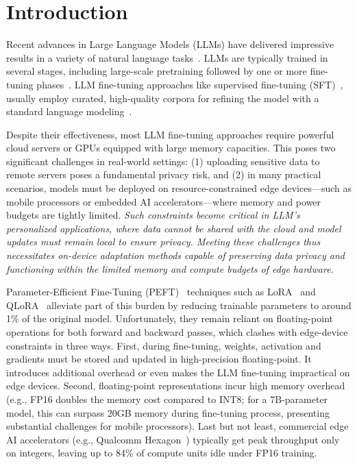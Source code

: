 \section{Introduction}
Recent advances in Large Language Models (LLMs) have delivered impressive results in a variety of natural language tasks~\citep{touvron2023llama,touvron2023llama2,liu2023gpt}.
LLMs are typically trained in several stages, including large-scale pretraining followed by one or more fine-tuning phases~\cite{dubey2024llama,liu2024deepseek}. 
LLM fine-tuning approaches like supervised fine-tuning (SFT)~\citep{zhang2023instruction}, usually employ curated, high-quality corpora for refining the model with a standard language modeling~\cite{chiang2023vicuna}.

Despite their effectiveness, most LLM fine-tuning approaches require powerful cloud servers or GPUs equipped with large memory capacities. 
This poses two significant challenges in real-world settings: (1) uploading sensitive data to remote servers poses a fundamental privacy risk, and (2) in many practical scenarios, models must be deployed on resource-constrained edge devices—such as mobile processors or embedded AI accelerators—where memory and power budgets are tightly limited.  
\textit{Such constraints become critical in LLM's personalized applications, where data cannot be shared with the cloud and model updates must remain local to ensure privacy. Meeting these challenges thus necessitates on-device adaptation methods capable of preserving data privacy and functioning within the limited memory and compute budgets of edge hardware.}

Parameter-Efficient Fine-Tuning (PEFT)~\cite{han2024parameter} techniques such as LoRA~\cite{hu2021lora} and QLoRA~\cite{dettmers2023qlora} alleviate part of this burden by reducing trainable parameters to around 1\% of the original model. Unfortunately, they remain reliant on floating-point operations for both forward and backward passes, which clashes with edge-device constraints in three ways. 
First, during fine-tuning, weights, activation and gradients must be stored and updated in high-precision floating-point. It introduces additional overhead or even makes the LLM fine-tuning impractical on edge devices. Second, floating-point representations incur high memory overhead (e.g., FP16 doubles the memory cost compared to INT8; for a 7B-parameter model, this can surpass 20GB memory during fine-tuning process, presenting substantial challenges for mobile processors). Last but not least, commercial edge AI accelerators (e.g., Qualcomm Hexagon~\cite{QUALCOMM2024}) typically get peak throughput only on integers, leaving up to 84\% of compute units idle under FP16 training.

